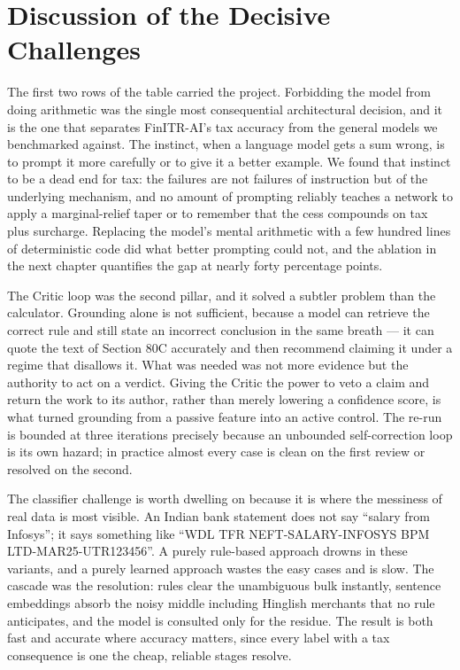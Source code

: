 \documentclass[12pt, a4paper, oneside]{report}
\begin{document}
\section*{Discussion of the Decisive Challenges}

The first two rows of the table carried the project. Forbidding the model from
doing arithmetic was the single most consequential architectural decision, and
it is the one that separates FinITR-AI's tax accuracy from the general models we
benchmarked against. The instinct, when a language model gets a sum wrong, is to
prompt it more carefully or to give it a better example. We found that instinct
to be a dead end for tax: the failures are not failures of instruction but of
the underlying mechanism, and no amount of prompting reliably teaches a network
to apply a marginal-relief taper or to remember that the cess compounds on tax
plus surcharge. Replacing the model's mental arithmetic with a few hundred lines
of deterministic code did what better prompting could not, and the ablation in
the next chapter quantifies the gap at nearly forty percentage points.

The Critic loop was the second pillar, and it solved a subtler problem than the
calculator. Grounding alone is not sufficient, because a model can retrieve the
correct rule and still state an incorrect conclusion in the same breath --- it
can quote the text of Section 80C accurately and then recommend claiming it
under a regime that disallows it. What was needed was not more evidence but the
authority to act on a verdict. Giving the Critic the power to veto a claim and
return the work to its author, rather than merely lowering a confidence score,
is what turned grounding from a passive feature into an active control. The
re-run is bounded at three iterations precisely because an unbounded
self-correction loop is its own hazard; in practice almost every case is clean
on the first review or resolved on the second.

The classifier challenge is worth dwelling on because it is where the messiness
of real data is most visible. An Indian bank statement does not say ``salary from
Infosys''; it says something like ``WDL TFR NEFT-SALARY-INFOSYS BPM
LTD-MAR25-UTR123456''. A purely rule-based approach drowns in these variants,
and a purely learned approach wastes the easy cases and is slow. The cascade was
the resolution: rules clear the unambiguous bulk instantly, sentence embeddings
absorb the noisy middle including Hinglish merchants that no rule anticipates,
and the model is consulted only for the residue. The result is both fast and
accurate where accuracy matters, since every label with a tax consequence is one
the cheap, reliable stages resolve.
\end{document}
